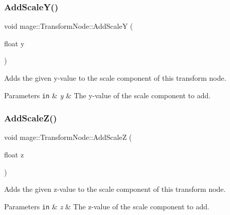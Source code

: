 \subsubsection{\texorpdfstring{Add\+Scale\+Y()}{AddScaleY()}}
{\footnotesize\ttfamily void mage\+::\+Transform\+Node\+::\+Add\+ScaleY (\begin{DoxyParamCaption}\item[{float}]{y }\end{DoxyParamCaption})\hspace{0.3cm}{\ttfamily [noexcept]}}

Adds the given y-\/value to the scale component of this transform node.


\begin{DoxyParams}[1]{Parameters}
\mbox{\tt in}  & {\em y} & The y-\/value of the scale component to add. \\
\hline
\end{DoxyParams}
\hypertarget{structmage_1_1_transform_node_ab02378da7fe0ff878c200c6814e51937}{}\label{structmage_1_1_transform_node_ab02378da7fe0ff878c200c6814e51937} 
\subsubsection{\texorpdfstring{Add\+Scale\+Z()}{AddScaleZ()}}
{\footnotesize\ttfamily void mage\+::\+Transform\+Node\+::\+Add\+ScaleZ (\begin{DoxyParamCaption}\item[{float}]{z }\end{DoxyParamCaption})\hspace{0.3cm}{\ttfamily [noexcept]}}

Adds the given z-\/value to the scale component of this transform node.


\begin{DoxyParams}[1]{Parameters}
\mbox{\tt in}  & {\em z} & The z-\/value of the scale component to add. \\
\hline
\end{DoxyParams}
\hypertarget{structmage_1_1_transform_node_a467c84142e3733e5358182ab1c7b88e2}{}\label{structmage_1_1_transform_node_a467c84142e3733e5358182ab1c7b88e2} 
